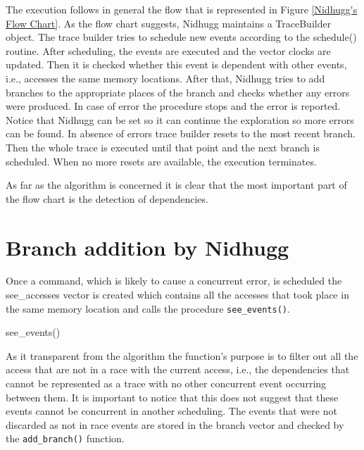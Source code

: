 The execution follows in general the flow that is represented in Figure \ref{Nidhugg's Flow Chart}.
As the flow chart suggests, Nidhugg maintains a TraceBuilder object. The trace builder tries to schedule new events according to the schedule() routine. 
After scheduling, the events
are executed and the vector clocks are updated. Then it is checked whether this event is dependent with other events, i.e., accesses the same
memory locations. After that, Nidhugg tries to add branches to the appropriate places of the branch and checks whether any errors were produced. 
In case of error the procedure stops
and the error is reported. Notice that Nidhugg can be set so it can continue the exploration so more errors can be found. In absence of errors trace builder resets to the most recent branch.
Then the whole trace is executed until that point and the next branch is scheduled. When no more resets are available, the execution terminates.

As far as the algorithm is concerned it is clear that the most important part of the flow chart is the detection of dependencies. 


\section{Branch addition by Nidhugg}

Once a command, which is likely to cause a concurrent error, is scheduled the see\_accesses vector is created which contains all the accesses that took place
in the same memory location and calls the procedure \verb|see_events()|.

\begin{algorithm}
    \caption{see\_events()}
\end{algorithm}

As it transparent from the algorithm the function's purpose is to filter out all the access that are not in a race with the current access,
i.e., the dependencies that cannot be represented as a trace with no other concurrent event occurring between them. It is important to notice
that this does not suggest that these events cannot be concurrent in another scheduling. The events that were not discarded as not in race events
are stored in the branch vector and checked by the \verb|add_branch()| function.

